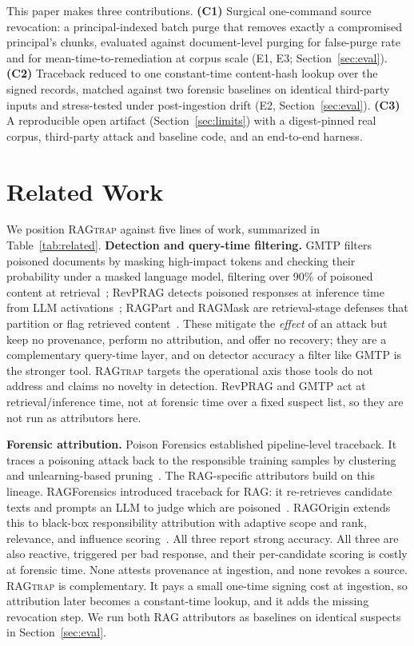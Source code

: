 \documentclass[12pt]{article}
\newcommand{\sysname}{\textsc{RAGtrap}\xspace}
\begin{document}
This paper makes three contributions.
\textbf{(C1)} Surgical one-command source revocation: a principal-indexed
batch purge that removes exactly a compromised principal's chunks, evaluated
against document-level purging for false-purge rate and for mean-time-to-remediation
at corpus scale (E1, E3; Section~\ref{sec:eval}).
\textbf{(C2)} Traceback reduced to one constant-time content-hash lookup over
the signed records, matched against two forensic baselines on identical
third-party inputs and stress-tested under post-ingestion drift (E2,
Section~\ref{sec:eval}).
\textbf{(C3)} A reproducible open artifact (Section~\ref{sec:limits}) with a
digest-pinned real corpus, third-party attack and baseline code, and an
end-to-end harness.

\section{Related Work}

We position \sysname{} against five lines of work, summarized in
Table~\ref{tab:related}. \textbf{Detection and query-time filtering.} GMTP
filters poisoned documents by masking high-impact tokens and checking their
probability under a masked language model, filtering over 90\% of poisoned
content at retrieval~\cite{gmtp}; RevPRAG detects poisoned responses at inference
time from LLM activations~\cite{revprag}; RAGPart and RAGMask are retrieval-stage
defenses that partition or flag retrieved content~\cite{ragpartmask}. These
mitigate the \emph{effect} of an attack but keep no provenance, perform no
attribution, and offer no recovery; they are a complementary query-time layer,
and on detector accuracy a filter like GMTP is the stronger tool. \sysname{}
targets the operational axis those tools do not address and claims no novelty in
detection. RevPRAG and GMTP act at retrieval/inference time, not at forensic
time over a fixed suspect list, so they are not run as attributors here.

\textbf{Forensic attribution.} Poison Forensics established pipeline-level
traceback. It traces a poisoning attack back to the responsible training samples
by clustering and unlearning-based pruning~\cite{poison-forensics}. The
RAG-specific attributors build on this lineage. RAGForensics introduced traceback
for RAG: it re-retrieves candidate texts and prompts an LLM to judge which are
poisoned~\cite{ragforensics}. RAGOrigin extends this to black-box responsibility
attribution with adaptive scope and rank, relevance, and influence
scoring~\cite{ragorigin}. All three report strong accuracy. All three are also
reactive, triggered per bad response, and their per-candidate scoring is costly
at forensic time. None attests provenance at ingestion, and none revokes a
source. \sysname{} is complementary. It pays a small one-time signing cost at
ingestion, so attribution later becomes a constant-time lookup, and it adds the
missing revocation step. We run both RAG attributors as baselines on identical
suspects in Section~\ref{sec:eval}.
\end{document}
